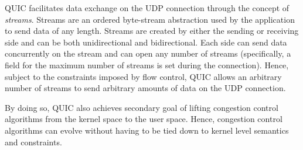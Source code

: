 QUIC facilitates data exchange on the UDP connection through the concept of \textit{streams}.
Streams are an ordered byte-stream abstraction used by the application to send data of any length.
Streams are created by either the sending or receiving side and can be both unidirectional and bidirectional.
Each side can send data concurrently on the stream and can open any number of streams (specifically, a field for the maximum number of streams is set during the connection).
Hence, subject to the constraints imposed by flow control, QUIC allows an arbitrary number of streams to send arbitrary amounts of data on the UDP connection.

By doing so, QUIC also achieves secondary goal of lifting congestion control algorithms from the kernel space to the user space.
Hence, congestion control algorithms can evolve without having to be tied down to kernel level semantics and constraints.

